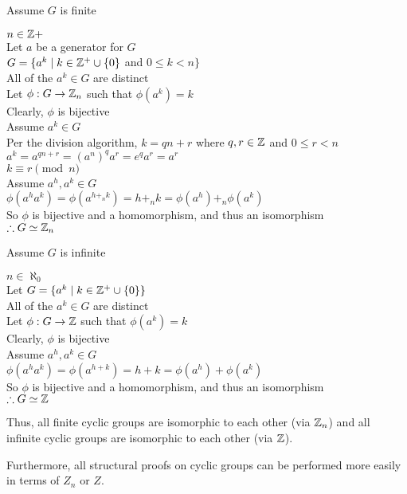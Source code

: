 \documentclass[letterpaper,12pt,fleqn]{article}
\newcommand{\p}{\phi}
\begin{document}
\begin{theproof}
  \listbreak
  \begin{description}
  \item Assume $G$ is finite

    $n\in\mathbb{Z}+$ \\
    Let $a$ be a generator for $G$ \\
    $G=\{a^k\mid k\in\mathbb{Z}^+\cup\{0\}$ and $0\le k<n\}$ \\
    All of the $a^k\in G$ are distinct \\
    Let $\p:G\to\Z_n$ such that $\p(a^k)=k$ \\
    Clearly, $\p$ is bijective \\
    Assume $a^k\in G$ \\
    Per the division algorithm, $k=qn+r$ where $q,r\in\mathbb{Z}$ and $0\le r<n$ \\
    $a^k=a^{qn+r}=(a^n)^qa^r=e^qa^r=a^r$ \\
    $k\equiv r\pmod{n}$ \\
    Assume $a^h,a^k\in G$ \\
    $\p(a^ha^k)=\p(a^{h+_n k})=h+_n k=\p(a^h)+_n\p(a^k)$ \\
    So $\p$ is bijective and a homomorphism, and thus an isomorphism \\
    $\therefore G\simeq\mathbb{Z}_n$

  \item Assume $G$ is infinite

    $n\in\aleph_0$ \\
    Let $G=\{a^k\mid k\in\mathbb{Z}^+\cup\{0\}\}$ \\
    All of the $a^k\in G$ are distinct \\
    Let $\p:G\to\Z$ such that $\p(a^k)=k$ \\
    Clearly, $\p$ is bijective \\
    Assume $a^h,a^k\in G$ \\
    $\p(a^ha^k)=\p(a^{h+k})=h+k=\p(a^h)+\p(a^k)$ \\
    So $\p$ is bijective and a homomorphism, and thus an isomorphism \\
    $\therefore G\simeq\mathbb{Z}$
  \end{description}
\end{theproof}

Thus, all finite cyclic groups are isomorphic to each other (via $\mathbb{Z}_n$) and
all infinite cyclic groups are isomorphic to each other (via $\mathbb{Z}$).

Furthermore, all structural proofs on cyclic groups can be performed more
easily in terms of $Z_n$ or $Z$.
\end{document}

